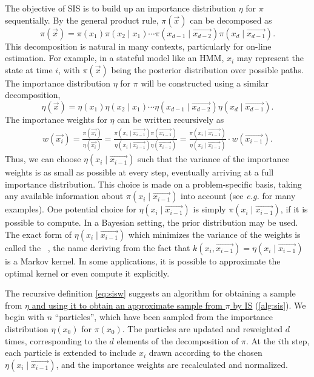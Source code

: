 The objective of \gls{SIS} is to build up an importance distribution $\eta$ for
$\pi$ sequentially. By the general product rule, $\pi(\vec{x})$ can be
decomposed as
\[
  \pi(\vec{x}) 
  = \pi(x_1) \pi(x_2 \mid x_1) \cdots
    \pi(x_{d-1} \mid \vec{x_{d-2}}) \pi(x_d \mid \vec{x_{d-1}}).
\]
This decomposition is natural in many contexts, particularly for on-line
estimation. For example, in a stateful model like an \gls{HMM}, $x_i$ may
represent the state at time $i$, with $\pi(\vec{x})$ being the posterior
distribution over possible paths. The importance distribution $\eta$ for $\pi$
will be constructed using a similar decomposition,
\[
  \eta(\vec{x}) 
  = \eta(x_1) \eta(x_2 \mid x_1) \cdots
    \eta(x_{d-1} \mid \vec{x_{d-2}}) \eta(x_d \mid \vec{x_{d-1}}).
\]
The importance weights for $\eta$ can be written recursively as
\begin{align}
  \label{eq:sisw}
  w(\vec{x_i}) = \frac{\pi(\vec{x_i})}{\eta(\vec{x_i})}
  = \frac{\pi(x_i \mid \vec{x_{i-1}})\pi(\vec{x_{i-1}})}
         {\eta(x_i \mid \vec{x_{i-1}})\eta(\vec{x_{i-1}})}
  = \frac{\pi(x_i \mid \vec{x_{i-1}})}
         {\eta(x_i \mid \vec{x_{i-1}})}\cdot w(\vec{x_{i-1}}).
\end{align}
Thus, we can choose $\eta(x_i \mid \vec{x_{i-1}})$ such that the variance of
the importance weights is as small as possible at every step, eventually
arriving at a full importance distribution. This choice is made on a
problem-specific basis, taking any available information about $\pi(x_i \mid
\vec{x_{i-1}})$ into account (see \textit{e.g.}
\autocite{smith2013sequential,liu2008monte} for many examples).  One potential
choice for $\eta(x_i \mid \vec{x_{i-1}})$ is simply $\pi(x_i \mid
\vec{x_{i-1}})$, if it is possible to compute. In a Bayesian setting, the
prior distribution may be used. The exact form of $\eta(x_i \mid
\vec{x_{i-1}})$ which minimizes the variance of the weights is called the
~\autocite{cappe2007overview}, the name deriving from the
fact that $k(x_i, \vec{x_{i-1}}) = \eta(x_i \mid \vec{x_{i-1}})$ is a Markov
kernel. In some applications, it is possible to approximate the optimal kernel
or even compute it explicitly.

The recursive definition \ref{eq:sisw} suggests an algorithm for obtaining a
sample from {\color{blue}\uline{$\eta$ and using it to obtain an approximate
sample from $\pi$ by \gls{IS}}} (\cref{alg:sis}).  We begin with $n$
``particles'', which have been sampled from the importance distribution
$\eta(x_0)$ for $\pi(x_0)$. The particles are updated and reweighted $d$ times,
corresponding to the $d$ elements of the decomposition of $\pi$. At the $i$th
step, each particle is extended to include $x_i$ drawn according to the chosen
$\eta(x_i \mid \vec{x_{i-1}})$, and the importance weights are recalculated and
normalized. 

